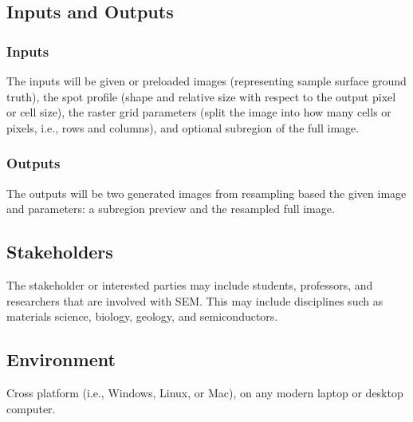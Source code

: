 \documentclass{article}
\begin{document}
\subsection{Inputs and Outputs}
\subsubsection{Inputs}
The inputs will be given or preloaded images (representing sample surface
ground truth), the spot profile (shape and relative size with respect to the
output pixel or cell size), the raster grid parameters (split the image into how
many cells or pixels, i.e., rows and columns), and optional subregion of the
full image.
\subsubsection{Outputs} The outputs will be two generated images
from resampling based the given image and parameters: a subregion preview and
the resampled full image.

\subsection{Stakeholders}
The stakeholder or interested parties may include
students, professors, and researchers that are involved with SEM. This may
include disciplines such as materials science, biology, geology, and
semiconductors.

\subsection{Environment}
Cross platform (i.e., Windows, Linux, or Mac), 
on any modern laptop or desktop computer.
\end{document}
